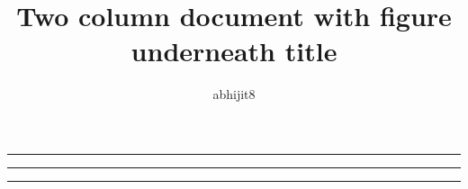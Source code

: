 \documentclass[11pt,a4paper,twocolumn,english]{article}
\title{Two column document with figure underneath title}
\author{abhijit8}
\begin{document}
\maketitle

\begin{strip}
    \centering\noindent
    \rule{0.75\linewidth}{0.5\linewidth}
\end{strip}

\blindtext[2]

\begin{strip}
    \centering\noindent
    \rule{0.75\linewidth}{0.5\linewidth}
\end{strip}

\medskip
\noindent
\begin{minipage}{\linewidth}
    \centering
    \rule{0.75\linewidth}{0.5\linewidth}
\end{minipage}

\medskip
\blindtext[4]
\end{document}
